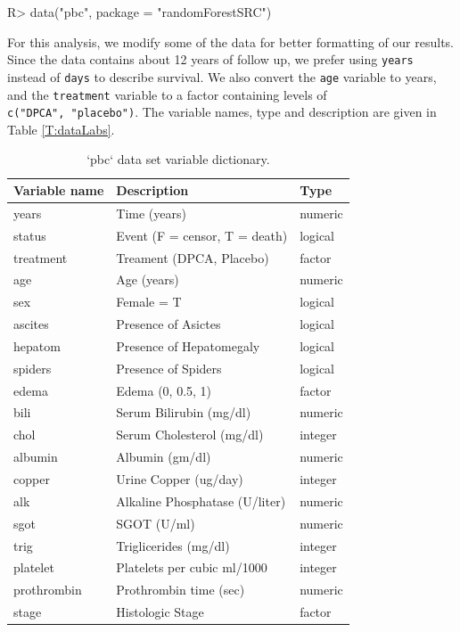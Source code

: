\documentclass[article]{jss}
\begin{document}
\begin{Schunk}
\begin{Sinput}
R> data("pbc", package = "randomForestSRC")
\end{Sinput}
\end{Schunk}

For this analysis, we modify some of the data for better formatting of
our results. Since the data contains about 12 years of follow up, we
prefer using \texttt{years} instead of \texttt{days} to describe
survival. We also convert the \texttt{age} variable to years, and the
\texttt{treatment} variable to a factor containing levels of
\texttt{c("DPCA",\ "placebo")}. The variable names, type and description
are given in Table \ref{T:dataLabs}.

\begin{Schunk}
\begin{table}

\caption{`pbc` data set variable dictionary.}
\centering
\begin{tabular}[t]{l|l|l}
\hline
Variable name & Description & Type\\
\hline
years & Time (years) & numeric\\
\hline
status & Event (F = censor, T = death) & logical\\
\hline
treatment & Treament (DPCA, Placebo) & factor\\
\hline
age & Age (years) & numeric\\
\hline
sex & Female = T & logical\\
\hline
ascites & Presence of Asictes & logical\\
\hline
hepatom & Presence of Hepatomegaly & logical\\
\hline
spiders & Presence of Spiders & logical\\
\hline
edema & Edema (0, 0.5, 1) & factor\\
\hline
bili & Serum Bilirubin (mg/dl) & numeric\\
\hline
chol & Serum Cholesterol (mg/dl) & integer\\
\hline
albumin & Albumin (gm/dl) & numeric\\
\hline
copper & Urine Copper (ug/day) & integer\\
\hline
alk & Alkaline Phosphatase (U/liter) & numeric\\
\hline
sgot & SGOT (U/ml) & numeric\\
\hline
trig & Triglicerides (mg/dl) & integer\\
\hline
platelet & Platelets per cubic ml/1000 & integer\\
\hline
prothrombin & Prothrombin time (sec) & numeric\\
\hline
stage & Histologic Stage & factor\\
\hline
\end{tabular}
\end{table}

\end{Schunk}
\end{document}
